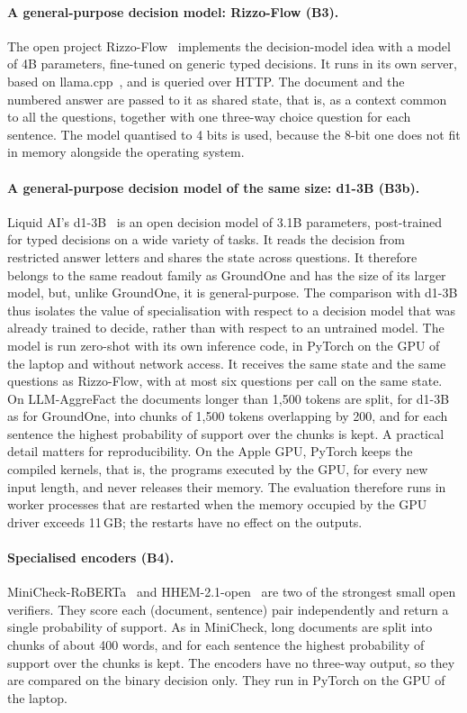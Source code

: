 \paragraph{A general-purpose decision model: Rizzo-Flow (B3).} The open project Rizzo-Flow~\cite{rizzoflow} implements
the decision-model idea with a model of 4B parameters, fine-tuned on generic typed decisions. It runs in its own server,
based on llama.cpp~\cite{llamacpp}, and is queried over HTTP. The document and the numbered answer are passed to it as
shared state, that is, as a context common to all the questions, together with one three-way choice question for each
sentence. The model quantised to 4 bits is used, because the 8-bit one does not fit in memory alongside the operating
system.

\paragraph{A general-purpose decision model of the same size: d1-3B (B3b).} Liquid AI's d1-3B~\cite{liquid2026d1} is an
open decision model of 3.1B parameters, post-trained for typed decisions on a wide variety of tasks. It reads the
decision from restricted answer letters and shares the state across questions. It therefore belongs to the same readout
family as GroundOne and has the size of its larger model, but, unlike GroundOne, it is general-purpose. The comparison
with d1-3B thus isolates the value of specialisation with respect to a decision model that was already trained to
decide, rather than with respect to an untrained model. The model is run zero-shot with its own inference code, in
PyTorch on the GPU of the laptop and without network access. It receives the same state and the same questions as
Rizzo-Flow, with at most six questions per call on the same state. On LLM-AggreFact the documents longer than
1{,}500 tokens are split, for d1-3B as for GroundOne, into chunks of 1{,}500 tokens overlapping by 200, and for each
sentence the highest probability of support over the chunks is kept. A practical detail matters for reproducibility. On
the Apple GPU, PyTorch keeps the compiled kernels, that is, the programs executed by the GPU, for every new input
length, and never releases their memory. The evaluation therefore runs in worker processes that are restarted when the
memory occupied by the GPU driver exceeds 11\,GB; the restarts have no effect on the outputs.

\paragraph{Specialised encoders (B4).} MiniCheck-RoBERTa~\cite{tang2024minicheck} and HHEM-2.1-open~\cite{vectara2024hhem}
are two of the strongest small open verifiers. They score each (document, sentence) pair independently and return a
single probability of support. As in MiniCheck, long documents are split into chunks of about 400 words, and for each
sentence the highest probability of support over the chunks is kept. The encoders have no three-way output, so they are
compared on the binary decision only. They run in PyTorch on the GPU of the laptop.

